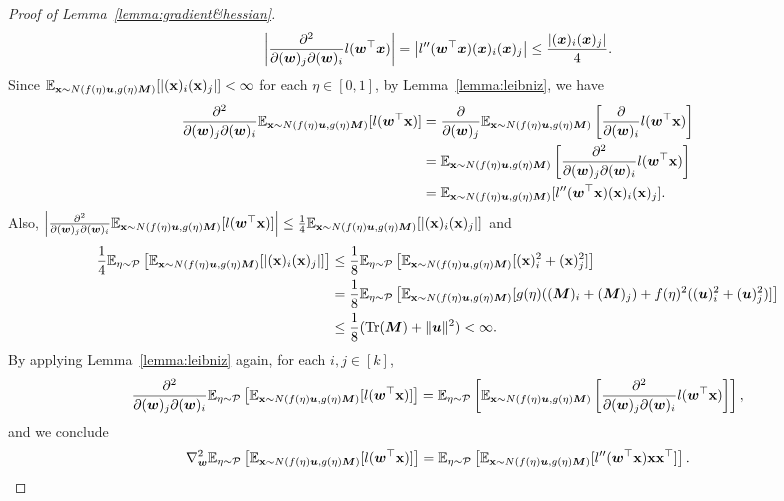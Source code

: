 \begin{proof}[Proof of Lemma~\ref{lemma:gradient&hessian}]
\begin{equation*}
        \left | \frac{\partial^2}{\partial ({\bm{w}})_j \partial ({\bm{w}})_i}l({\bm{w}}^\top {\bm{x}}) \right|  =  \left |l''({\bm{w}}^\top {\bm{x}}) ({\bm{x}})_i ({\bm{x}})_j \right|\leq \frac{|({\bm{x}})_i({\bm{x}})_j|}{4}.
    \end{equation*}
    Since $\mathbb{E}_{{\mathbf{x}} \sim N(f(\eta){\bm{u}}, g(\eta){\bm{M}})}[|({\mathbf{x}})_i({\mathbf{x}})_j|]<\infty$ for each $\eta \in [0,1]$, by Lemma~\ref{lemma:leibniz}, we have
    \begin{align*}
         \frac{\partial^2}{\partial ({\bm{w}})_j \partial ({\bm{w}})_i}\mathbb{E}_{{\mathbf{x}} \sim N(f(\eta){\bm{u}}, g(\eta){\bm{M}})}[l({\bm{w}}^\top {\mathbf{x}})] &= \frac{\partial}{\partial ({\bm{w}})_j}\mathbb{E}_{{\mathbf{x}} \sim N(f(\eta){\bm{u}}, g(\eta){\bm{M}})}\left [\frac{\partial}{\partial ({\bm{w}})_i}l({\bm{w}}^\top {\mathbf{x}})\right] \\
         &= \mathbb{E}_{{\mathbf{x}} \sim N(f(\eta){\bm{u}}, g(\eta){\bm{M}})}\left [\frac{\partial^2}{\partial ({\bm{w}})_j \partial ({\bm{w}})_i}l({\bm{w}}^\top {\mathbf{x}}) \right ]\\
         &= \mathbb{E}_{{\mathbf{x}} \sim N(f(\eta){\bm{u}}, g(\eta){\bm{M}})}[l''({\bm{w}}^\top {\mathbf{x}})({\mathbf{x}})_i ({\mathbf{x}})_j].
    \end{align*}
    Also,  $\left| \frac{\partial^2}{\partial ({\bm{w}})_j \partial ({\bm{w}})_i}\mathbb{E}_{{\mathbf{x}} \sim N(f(\eta){\bm{u}}, g(\eta){\bm{M}})}[l({\bm{w}}^\top {\mathbf{x}})] \right| \leq  \frac{1}{4}\mathbb{E}_{{\mathbf{x}} \sim N(f(\eta){\bm{u}}, g(\eta){\bm{M}})}[|({\mathbf{x}})_i({\mathbf{x}})_j|]$ and
    \begin{align*}
        \frac{1}{4}\mathbb{E}_{\eta \sim \mathcal{P}} \left [\mathbb{E}_{{\mathbf{x}} \sim N(f(\eta){\bm{u}}, g(\eta){\bm{M}})}[|({\mathbf{x}})_i({\mathbf{x}})_j|] \right ]
        &\leq \frac{1}{8} \mathbb{E}_{\eta \sim \mathcal{P}} \left [\mathbb{E}_{{\mathbf{x}} \sim N(f(\eta){\bm{u}}, g(\eta){\bm{M}})}[({\mathbf{x}})_i^2 + ({\mathbf{x}})_j^2] \right ]\\
        &= \frac{1}{8} \mathbb{E}_{\eta \sim \mathcal{P}} \left [\mathbb{E}_{{\mathbf{x}} \sim N(f(\eta){\bm{u}}, g(\eta){\bm{M}})}[g(\eta) (({\bm{M}})_i + ({\bm{M}})_j) + f(\eta)^2 (({\bm{u}})_i^2 + ({\bm{u}})_j^2)] \right ]\\
        &\leq \frac{1}{8} ( \operatorname{Tr} ({\bm{M}}) + \lVert {\bm{u}} \rVert^2) <\infty.
    \end{align*}
By applying Lemma~\ref{lemma:leibniz} again, for each $i,j \in [k]$, 
\begin{equation*}
    \frac{\partial^2}{\partial ({\bm{w}})_j \partial ({\bm{w}})_i}\mathbb{E}_{\eta \sim \mathcal{P}}\left [\mathbb{E}_{{\mathbf{x}} \sim N(f(\eta){\bm{u}}, g(\eta){\bm{M}})}[l({\bm{w}}^\top {\mathbf{x}})] \right ] = \mathbb{E}_{\eta \sim \mathcal{P}}\left[\mathbb{E}_{{\mathbf{x}} \sim N(f(\eta){\bm{u}}, g(\eta){\bm{M}})}\left[\frac{\partial^2}{\partial ({\bm{w}})_j \partial ({\bm{w}})_i}l({\bm{w}}^\top {\mathbf{x}})\right]\right],
\end{equation*}
and we conclude 
\begin{equation*}
    \nabla_{\bm{w}}^2 \mathbb{E}_{\eta \sim \mathcal{P}} \left [\mathbb{E}_{{\mathbf{x}} \sim N(f(\eta){\bm{u}}, g(\eta){\bm{M}})}[l({\bm{w}}^\top {\mathbf{x}})] \right ]
    = \mathbb{E}_{\eta \sim \mathcal{P}} \left [\mathbb{E}_{{\mathbf{x}} \sim N(f(\eta){\bm{u}}, g(\eta){\bm{M}})}[l''({\bm{w}}^\top {\mathbf{x}}){\mathbf{x}} {\mathbf{x}}^\top ] \right ].
\end{equation*}
\end{proof}

